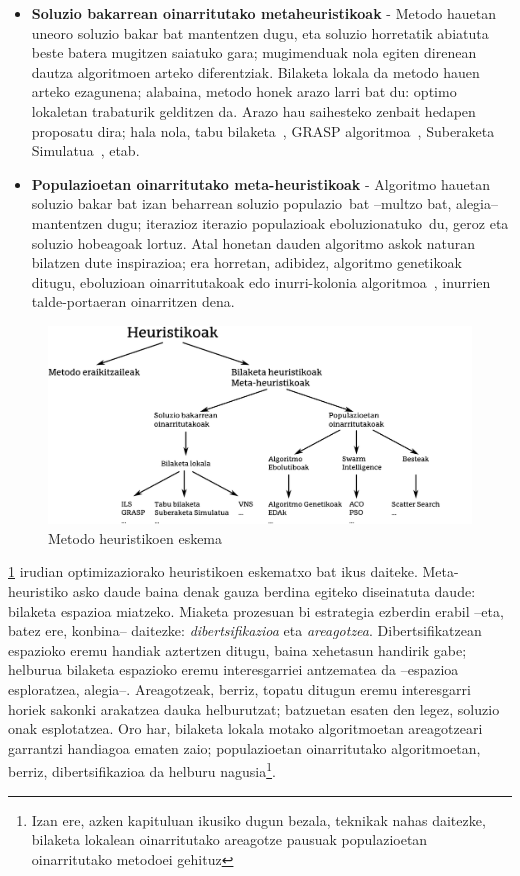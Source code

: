 \documentclass[eu]{ifirak}\usepackage[]{graphicx}\usepackage[]{color}
\newcommand{\zkk}{\guillemotleft}
\newcommand{\skk}{\guillemotright}
\begin{document}
\begin{itemize}
\item \textbf{Soluzio bakarrean oinarritutako metaheuristikoak} - Metodo hauetan uneoro soluzio bakar bat mantentzen dugu, eta soluzio horretatik abiatuta beste batera mugitzen saiatuko gara; mugimenduak nola egiten direnean dautza algoritmoen arteko diferentziak. Bilaketa lokala da metodo hauen arteko ezagunena; alabaina, metodo honek arazo larri bat du: optimo lokaletan trabaturik gelditzen da. Arazo hau saihesteko zenbait hedapen proposatu dira; hala nola, tabu bilaketa~\cite{glover1986}, GRASP algoritmoa~\cite{feo1989}, Suberaketa Simulatua~\cite{kirkpatrick1983,cerny1985}, etab.
\item \textbf{Populazioetan oinarritutako meta-heuristikoak} - Algoritmo hauetan soluzio bakar bat izan beharrean soluzio \zkk populazio\skk\ bat --multzo bat, alegia-- mantentzen dugu; iterazioz iterazio populazioak \zkk eboluzionatuko\skk\ du, geroz eta soluzio hobeagoak lortuz. Atal honetan dauden algoritmo askok naturan bilatzen dute inspirazioa; era horretan, adibidez, algoritmo genetikoak~\cite{holland1975} ditugu, eboluzioan oinarritutakoak edo inurri-kolonia algoritmoa~\cite{dorigo1992}, inurrien talde-portaeran oinarritzen dena.
\end{itemize}

\begin{figure}[t]
\centering
\includegraphics[width=1\linewidth]{./Irudiak/heur_sailkap}
\caption{Metodo heuristikoen eskema}
\label{fig:heur_sailkap}
\end{figure}

\ref{fig:heur_sailkap} irudian optimizaziorako heuristikoen eskematxo bat ikus daiteke. Meta-heuristiko asko daude baina denak gauza berdina egiteko diseinatuta daude: bilaketa espazioa miatzeko. Miaketa prozesuan bi estrategia ezberdin erabil --eta, batez ere, konbina-- daitezke: \textit{dibertsifikazioa} eta \textit{areagotzea}. Dibertsifikatzean espazioko eremu handiak aztertzen ditugu, baina xehetasun handirik gabe; helburua bilaketa espazioko eremu interesgarriei antzematea da --espazioa esploratzea, alegia--. Areagotzeak, berriz, topatu ditugun eremu interesgarri horiek sakonki arakatzea dauka helburutzat; batzuetan esaten den legez, soluzio onak esplotatzea. Oro har, bilaketa lokala motako algoritmoetan areagotzeari garrantzi handiagoa ematen zaio; populazioetan oinarritutako algoritmoetan, berriz, dibertsifikazioa da helburu nagusia\footnote{Izan ere, azken kapituluan ikusiko dugun bezala, teknikak nahas daitezke, bilaketa lokalean oinarritutako areagotze pausuak populazioetan oinarritutako metodoei gehituz}.
\end{document}
